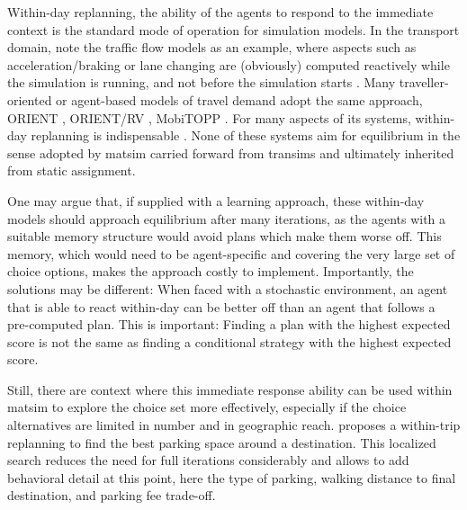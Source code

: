 Within-day replanning, \ie the ability of the agents to respond to the immediate context is the standard mode of operation for simulation models. 
%
In the transport domain, note the traffic flow models as an example, where aspects such as acceleration/braking or lane changing are (obviously) computed reactively while the simulation is running, and not before the simulation starts \citep[e.g.][]{Wiedemann_PhDThesis_1974}.
%
Many traveller-oriented or agent-based models of travel demand adopt the same approach, \cf ORIENT \citep[][]{Sparmann_TechRep_1980}, ORIENT/RV \citep{AxhausenHerz_JTE_1989}, MobiTOPP \citep[][]{SchnittgerZumkeller_ETC_2004}.
%
For many aspects of \acrfull{its} systems, within-day replanning is indispensable \citep[e.g.][]{hall-1993,EmmerinkEtAl_TransResC_1995,Dobler_PhDThesis_2013}.
%
None of these systems aim for equilibrium in the sense adopted by \gls{matsim} carried forward from \gls{transims} and ultimately inherited from static assignment.


One may argue that, if supplied with a learning approach, these within-day models should approach equilibrium after many iterations, as the agents with a suitable memory structure would avoid plans which make them worse off. 
%
This memory, which would need to be agent-specific and covering the very large set of choice options, makes the approach costly to implement.
%
Importantly, the solutions may be different: When faced with a stochastic environment, an agent that is able to react within-day can be better off than an agent that follows a pre-computed plan. This is important: Finding a plan with the highest expected score is not the same as finding a conditional strategy with the highest expected score.  

Still, there are context where this immediate response ability can be used within \gls{matsim} to explore the choice set more effectively, especially if the choice alternatives are limited in number and in geographic reach. 
\citet[][]{WaraichEtAl_TechRep_IVT_2013_2}
proposes a 
within-trip replanning to find the best parking space around a destination.
This localized search reduces the need for full iterations considerably and allows to add behavioral detail at this point, here the type of parking, walking distance to final destination, and parking fee trade-off. 

